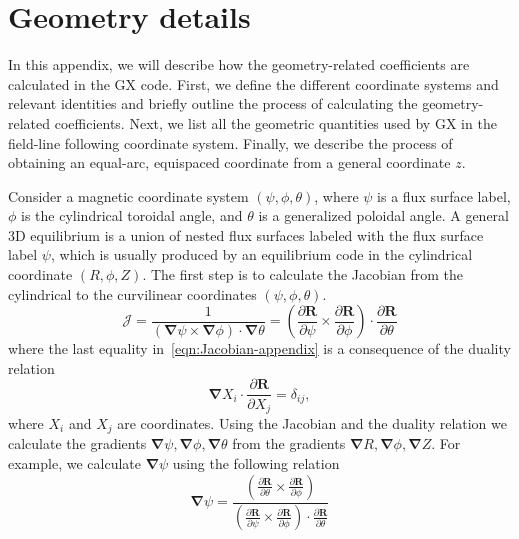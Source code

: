 \documentclass{jpp}
\newcommand{\GX}{{GX}\xspace}
\begin{document}
\section{Geometry details}
\label{app:geometry-appendix1}
In this appendix, we will describe how the geometry-related coefficients are calculated in the \GX code. First, we define the different coordinate systems and relevant identities and briefly outline the process of calculating the geometry-related coefficients. Next, we list all the geometric quantities used by \GX in the field-line following coordinate system. Finally, we describe the process of obtaining an equal-arc, equispaced coordinate from a general coordinate $z$. %

Consider a magnetic coordinate system $(\psi, \phi, \theta)$, where $\psi$ is a flux surface label, $\phi$ is the cylindrical toroidal angle, and $\theta$ is a generalized poloidal angle. A general 3D equilibrium is a union of nested flux surfaces labeled with the flux surface label $\psi$, which is usually produced by an equilibrium code in the cylindrical coordinate $(R, \phi, Z)$. The first step is to calculate the Jacobian from the cylindrical to the curvilinear coordinates $(\psi, \phi, \theta)$. 
\begin{equation}
    \mathcal{J}  = \frac{1}{(\boldsymbol{\nabla}\psi \times \boldsymbol{\nabla}\phi)\cdot \boldsymbol{\nabla}\theta} = \left(\frac{\partial \boldsymbol{R}}{\partial \psi} \times \frac{\partial \boldsymbol{R}}{\partial \phi}\right)\cdot\frac{\partial \boldsymbol{R}}{\partial \theta}
    \label{eqn:Jacobian-appendix}
\end{equation}
where the last equality in~\eqref{eqn:Jacobian-appendix} is a consequence of the duality relation~\citep{Dhaeseleer1991}
\begin{equation}
    \boldsymbol{\nabla}X_i \cdot \frac{\partial \boldsymbol{R}}{\partial X_j} = \delta_{ij},
    \label{eqn:Duality-relation}
\end{equation}
where $X_i$ and $X_{j}$ are coordinates. Using the Jacobian and the duality relation we calculate the gradients $\boldsymbol{\nabla} \psi, \boldsymbol{\nabla} \phi, \boldsymbol{\nabla} \theta$ from the gradients $\boldsymbol{\nabla} R,  \boldsymbol{\nabla} \phi,  \boldsymbol{\nabla} Z$. For example, we calculate $\boldsymbol{\nabla} \psi$ using the following relation
\begin{equation}
    \boldsymbol{\nabla} \psi = \frac{\left(\frac{\partial \boldsymbol{R}}{\partial \theta} \times \frac{\partial \boldsymbol{R}}{\partial \phi}\right)}{\left(\frac{\partial \boldsymbol{R}}{\partial \psi} \times \frac{\partial \boldsymbol{R}}{\partial \phi}\right)\cdot\frac{\partial \boldsymbol{R}}{\partial \theta}}
\end{equation}
\end{document}
